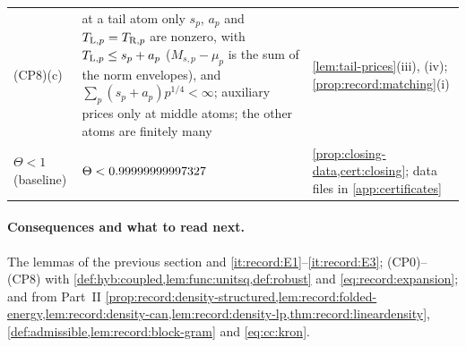 {\begin{longtable}{@{}>{\raggedright\arraybackslash}p{2.75cm}>{\raggedright\arraybackslash}p{6.1cm}>{\raggedright\arraybackslash}p{5.95cm}@{}}
(CP8)(c) & at a tail atom only $s_p$, $a_p$ and $T_{{\rm L},p}=T_{{\rm R},p}$ are nonzero, with $T_{{\rm L},p}\le s_p+a_p$ ($M_{s,p}-\mu_p$ is the sum of the norm envelopes), and $\sum_p(s_p+a_p)p^{1/4}<\infty$; auxiliary prices only at middle atoms; the other atoms are finitely many & \cref{lem:tail-prices}(iii), (iv); \cref{prop:record:matching}(i)\\
$\Theta<1$ (baseline) & $\Theta<0.99999999997327$ & \cref{prop:closing-data,cert:closing}; data files in \cref{app:certificates}\\
\end{longtable}
}

\paragraph{Consequences and what to read next.}
The lemmas of the previous section and \ref{it:record:E1}--\ref{it:record:E3};
(CP0)--(CP8) with \cref{def:hyb:coupled,lem:func:unitsq,def:robust}
and \eqref{eq:record:expansion}; and from Part~II
\cref{prop:record:density-structured,lem:record:folded-energy,lem:record:density-can,lem:record:density-lp,thm:record:lineardensity},
\cref{def:admissible,lem:record:block-gram} and \cref{eq:cc:kron}.
